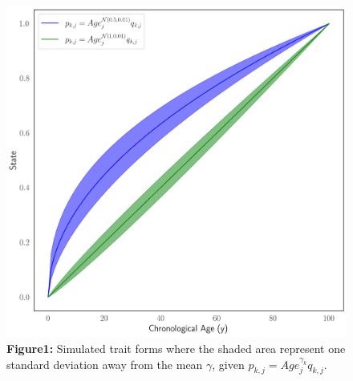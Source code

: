 \documentclass{article}
\begin{document}
{{\begin{center}
    \begin{figure}
    \includegraphics[scale=.4]{Figures/Figure1.png}    
    \footnotesize
    \caption*{\small \textbf{Figure1:} Simulated trait forms where the shaded area represent one 
    standard deviation away from the mean $\gamma$, given $p_{k,j} = Age_j^{\gamma_{k}} q_{k,j}$.}
    \end{figure}
\end{center}

}}
\end{document}
